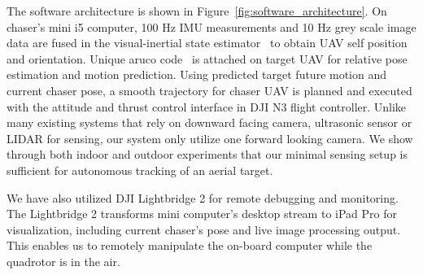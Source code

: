 The software architecture is shown in Figure~\ref{fig:software_architecture}. On chaser's mini i5 computer, 100 Hz IMU measurements and 10 Hz grey scale image data are fused in the visual-inertial state estimator~\cite{VINS} to obtain UAV self position and orientation. Unique aruco code~\cite{Aruco} is attached on target UAV for relative pose estimation and motion prediction. Using predicted target future motion and current chaser pose, a smooth trajectory for chaser UAV is planned and executed with the attitude and thrust control interface in DJI N3 flight controller. Unlike many existing systems that rely on downward facing camera, ultrasonic sensor or LIDAR for sensing, our system only utilize one forward looking camera. We show through both indoor and outdoor experiments that our minimal sensing setup is sufficient for autonomous tracking of an aerial target.

We have also utilized DJI Lightbridge 2 for remote debugging and monitoring. The Lightbridge 2 transforms mini computer's desktop stream to iPad Pro for visualization, including current chaser's pose and live image processing output. This enables us to remotely manipulate the on-board computer while the quadrotor is in the air.

\newpage
